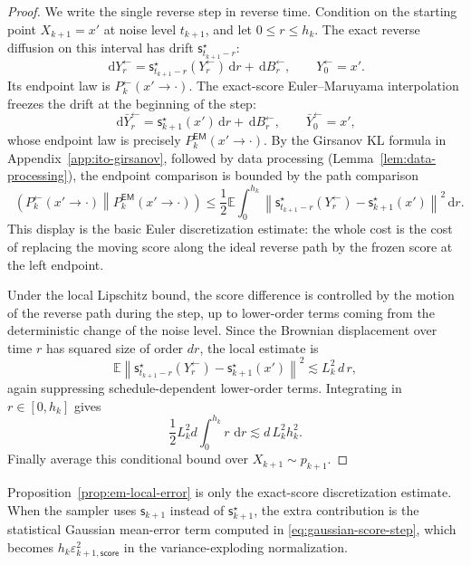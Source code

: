 \documentclass{amsart}
\numberwithin{equation}{section}
\theoremstyle{plain}
\theoremstyle{definition}
\theoremstyle{remark}
\DeclareMathOperator{\KL}{D_{\mathsf{KL}}}
\newcommand{\E}{\mathbb{E}}
\newcommand{\dd}{\,\mathrm{d}}
\newcommand{\eps}{\varepsilon}
\newcommand{\norm}[1]{\left\lVert #1 \right\rVert}
\newcommand{\sstar}{\mathsf{s}^{\star}}
\newcommand{\score}{\mathsf{s}}
\begin{document}
\begin{proof}
We write the single reverse step in reverse time.  Condition on the starting
point $X_{k+1}=x'$ at noise level $t_{k+1}$, and let
$0\leq r\leq h_k$.  The exact reverse diffusion on this interval has drift
$\sstar_{t_{k+1}-r}$:
\[
    \dd Y^{\leftarrow}_r=\sstar_{t_{k+1}-r}(Y^{\leftarrow}_r)\dd r+\dd B^{\leftarrow}_r,
    \qquad
    Y^{\leftarrow}_0=x'.
\]
Its endpoint law is $P_k^{\leftarrow}(x' \to \cdot)$.  The exact-score
Euler--Maruyama interpolation freezes the drift at the beginning of the step:
\[
    \dd \bar Y^{\leftarrow}_r=\sstar_{k+1}(x')\dd r+\dd B^{\leftarrow}_r,
    \qquad
    \bar Y^{\leftarrow}_0=x',
\]
whose endpoint law is precisely
$P_k^{\mathsf{EM}}(x' \to \cdot)$.  By the Girsanov KL formula in
Appendix~\ref{app:ito-girsanov}, followed by data processing
(Lemma~\ref{lem:data-processing}), the endpoint comparison is bounded by the
path comparison
\[
    \KL\!\left(
        P_k^{\leftarrow}(x' \to \cdot)
        \middle\|
        P_k^{\mathsf{EM}}(x' \to \cdot)
    \right)
    \leq
    \frac12
    \E\int_0^{h_k}
    \norm{
        \sstar_{t_{k+1}-r}(Y^{\leftarrow}_r)-\sstar_{k+1}(x')
    }^2\dd r.
\]
This display is the basic Euler discretization estimate: the whole cost is the
cost of replacing the moving score along the ideal reverse path by the frozen
score at the left endpoint.

Under the local Lipschitz bound, the score difference is controlled by the
motion of the reverse path during the step, up to lower-order terms coming from
the deterministic change of the noise level.  Since the Brownian displacement
over time $r$ has squared size of order $dr$, the local estimate is
\[
    \E\norm{
        \sstar_{t_{k+1}-r}(Y^{\leftarrow}_r)-\sstar_{k+1}(x')
    }^2
    \lesssim
    L_k^2\,d\,r,
\]
again suppressing schedule-dependent lower-order terms.  Integrating in
$r\in[0,h_k]$ gives
\[
    \frac12L_k^2d\int_0^{h_k} r\,\dd r
    \lesssim
    d\,L_k^2h_k^2.
\]
Finally average this conditional bound over $X_{k+1}\sim p_{k+1}$.
\end{proof}

Proposition~\ref{prop:em-local-error} is only the exact-score discretization
estimate.  When the sampler uses $\score_{k+1}$ instead of $\sstar_{k+1}$, the
extra contribution is the statistical Gaussian mean-error term computed in
\eqref{eq:gaussian-score-step}, which becomes
$h_k\eps_{k+1,\mathsf{score}}^2$ in the variance-exploding
normalization.
\end{document}
